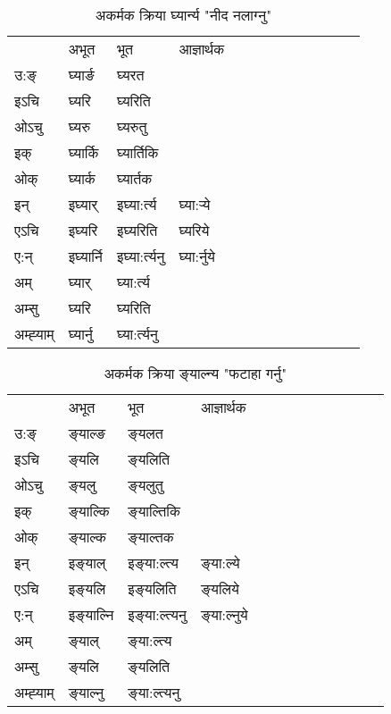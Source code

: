 \begin{table}[H]
\centering
\caption{\label{ɛr.vi} अकर्मक क्रिया  घ्यार्न्य  "नीद नलाग्नु"  }
\begin{tabular}{l|l|l|l|l|l|l|l|l|l|l|l|l}  \toprule
&अभूत & भूत & आज्ञार्थक \\ 
उ:ङ्‌ &घ्यार्ङ &घ्यरत \\ 
इऽचि &घ्यरि &घ्यरिति   \\ 
ओऽचु &घ्यरु &घ्यरुतु   \\ 
इक् &घ्यार्कि &घ्यार्तिकि   \\ 
ओक् &घ्यार्क &घ्यार्तक   \\ 
इन् & इघ्यार् & इघ्या:र्त्य &घ्या:र्‍ये  \\ 
एऽचि & इघ्यरि & इघ्यरिति &घ्यरिये    \\ 
ए:न् & इघ्यार्नि  & इघ्या:र्त्यनु &घ्या:र्नुये  \\ 
अम् & घ्यार् & घ्या:र्त्य   \\ 
अम्सु & घ्यरि & घ्यरिति   \\ 
अम्ह्‍याम् & घ्यार्नु  & घ्या:र्त्यनु \\ 
\bottomrule
\end{tabular}
\end{table}


\begin{table}[H]
\centering
\caption{\label{ɛl.vi} अकर्मक क्रिया  ङ्‌याल्न्य  "फटाहा गर्नु"  }
\begin{tabular}{l|l|l|l|l|l|l|l|l|l|l|l|l}  \toprule
&अभूत & भूत & आज्ञार्थक \\ 
उ:ङ्‌ &ङ्‌याल्ङ &ङ्‌यलत \\ 
इऽचि &ङ्‌यलि &ङ्‌यलिति   \\ 
ओऽचु &ङ्‌यलु &ङ्‌यलुतु   \\ 
इक् &ङ्‌याल्कि &ङ्‌याल्तिकि   \\ 
ओक् &ङ्‌याल्क &ङ्‌याल्तक   \\ 
इन् & इङ्‌याल् & इङ्‌या:ल्त्य &ङ्‌या:ल्ये  \\ 
एऽचि & इङ्‌यलि & इङ्‌यलिति &ङ्‌यलिये    \\ 
ए:न् & इङ्‌याल्नि  & इङ्‌या:ल्त्यनु &ङ्‌या:ल्नुये  \\ 
अम् & ङ्‌याल् & ङ्‌या:ल्त्य   \\ 
अम्सु & ङ्‌यलि & ङ्‌यलिति   \\ 
अम्ह्‍याम् & ङ्‌याल्नु  & ङ्‌या:ल्त्यनु \\ 
\bottomrule
\end{tabular}
\end{table}


